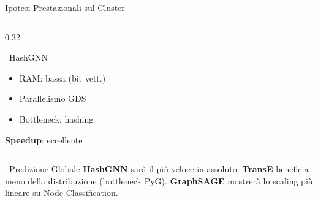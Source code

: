\documentclass[aspectratio=169]{beamer}
\newcommand{\icoBrain}{\faBrain}
\newcommand{\icoRocket}{\faRocket}
\newcommand{\icoCheck}{\faCheckCircle}
\newcommand{\icoBrain}{\ding{108}}
\newcommand{\icoRocket}{\ding{224}}
\newcommand{\icoCheck}{\ding{52}}
\newcommand{\pro}{{\color{successGreen}\icoCheck}}
\newcommand{\neu}{{\color{unigold}$\sim$}}
\begin{document}
\begin{frame}{Ipotesi Prestazionali sul Cluster}
\begin{columns}[T]
\begin{column}{0.32\textwidth}
\begin{block}{\color{hashgnnPurple}\icoBrain\ HashGNN}
\begin{itemize}
          \item[\pro] RAM: bassa (bit vett.)
          \item[\pro] Parallelismo GDS
          \item[\neu] Bottleneck: hashing
        \end{itemize}
        \vspace{4pt}
        {\scriptsize\textbf{Speedup}: eccellente}
      \end{block}
    \end{column}
  \end{columns}
  \vspace{0.3cm}
  \begin{alertblock}{\icoRocket\ Predizione Globale}
    \small
    {\color{hashgnnPurple}\textbf{HashGNN}} sar\`a il pi\`u veloce in assoluto.
    {\color{transeGreen}\textbf{TransE}} beneficia meno della distribuzione (bottleneck PyG).
    {\color{graphsageBlue}\textbf{GraphSAGE}} mostrer\`a lo scaling pi\`u lineare su Node Classification.
  \end{alertblock}
\end{frame}
\end{document}

